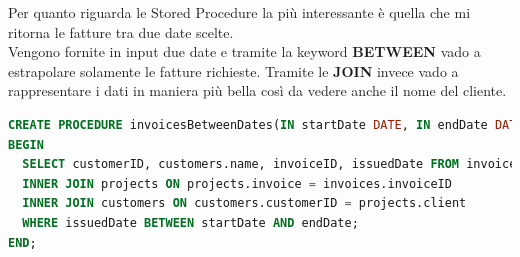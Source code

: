 \documentclass[12pt,a4paper]{article}
\begin{document}
\Sep \noindent
Per quanto riguarda le Stored Procedure la più interessante è quella che mi ritorna le fatture tra due date scelte.\\
Vengono fornite in input due date e tramite la keyword \textbf{BETWEEN} vado a estrapolare solamente le fatture richieste. Tramite le \textbf{JOIN} invece vado a rappresentare i dati in maniera più bella così da vedere anche il nome del cliente.
\begin{lstlisting}[language = SQL,label={lst:invoices-dates}]
CREATE PROCEDURE invoicesBetweenDates(IN startDate DATE, IN endDate DATE)
BEGIN
  SELECT customerID, customers.name, invoiceID, issuedDate FROM invoices
  INNER JOIN projects ON projects.invoice = invoices.invoiceID
  INNER JOIN customers ON customers.customerID = projects.client
  WHERE issuedDate BETWEEN startDate AND endDate;
END;
\end{lstlisting}


\end{document}
